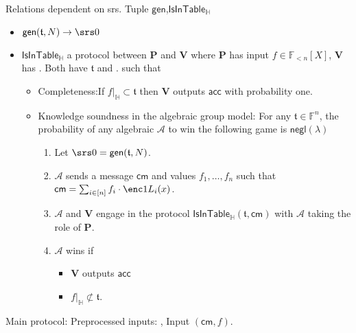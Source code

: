 \documentclass[11pt]{article} %
\newcommand{\F}{\ensuremath{\mathbb F}\xspace}
\newcommand{\adv}{\ensuremath{\mathcal A}\xspace}
\newcommand{\cm}{\ensuremath{\mathsf{cm}}\xspace}
\newcommand{\negl}{\ensuremath{\mathsf{negl}(\lambda)}\xspace}
\newcommand{\acc}{\ensuremath{\mathsf{acc}}\xspace}
\newcommand{\gen}{\ensuremath{\mathsf{gen}}\xspace}
\newcommand{\prv}{\ensuremath{\mathsf{\mathbf{P}}}\xspace}
\newcommand{\ver}{\ensuremath{\mathsf{\mathbf{V}}}\xspace}
\newcommand{\polysofdeg}[1]{\ensuremath{\F_{< #1}[X]}\xspace}
\newcommand{\sumi}[1]{\sum_{i\in[#1]}}
\newcommand{\restricttoset}[2]{\ensuremath{#1|_{#2}}\xspace}
\newcommand{\isintable}{\ensuremath{\mathsf{IsInTable_{\subspace}}}\xspace}
\newcommand{\subspace}{\ensuremath{\mathbb{H}}\xspace}
\newcommand{\bigspace}{\ensuremath{\mathbb{V}}\xspace}
\newcommand{\witsize}{\ensuremath{n}\xspace}
\newcommand{\tabsize}{\ensuremath{N}\xspace}
\newcommand{\tab}{\ensuremath{\mathfrak{t}}\xspace}
\begin{document}
Relations dependent on srs.
Tuple \gen,\isintable
\begin{itemize}
 \item $\gen(\tab,\tabsize)\to \srs0$
 \item $\isintable$ a protocol between \prv and \ver where \prv has input $f\in \polysofdeg{\witsize}$, \ver has .
 Both have \tab and .
 such that
 \begin{itemize}
  \item Completeness:If $\restricttoset{f}{\subspace}\subset \tab$ then \ver outputs \acc with probability one.
  \item Knowledge soundness in the algebraic group model:
   For any $\tab\in\F^\witsize$, the probability of any algebraic \adv to win the following game is \negl

\begin{enumerate}
 \item Let $\srs0=\gen(\tab,\tabsize)$.
 \item \adv sends a message \cm and values $f_1,\ldots, f_\witsize$ such that $\cm=\sumi{\witsize}f_i\cdot \enc1{L_i(x)}$.
 \item \adv and \ver engage in the protocol $\isintable(\tab,\cm)$ with \adv taking the role of \prv.
 \item \adv wins if 
 \begin{itemize}
  \item \ver outputs \acc
  \item $\restricttoset{f}{\subspace}\not\subset \tab$.
 \end{itemize}

\end{enumerate}
\end{itemize}
\end{itemize}
Main protocol:
Preprocessed inputs:
\enc2{Z_\bigspace(x)}, 
Input $(\cm,f)$.
\end{document}
